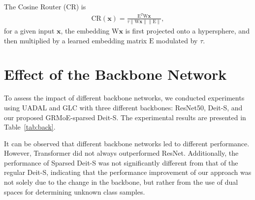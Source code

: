 \documentclass[10pt,twocolumn,letterpaper]{article}
\begin{document}
The Cosine Router (CR) is
\begin{align}
   \text{CR}(\bm{x}) = \frac{\text{E}^T\text{W}\bm{x}}{\tau \|\text{W}\bm{x}\| \|\text{E} \|},
\end{align}
for a given input $\bm{x}$, the embedding $\text{W}\bm{x} $ is first projected onto a hypersphere, and then multiplied by a learned embedding matrix $\text{E}$ modulated by $\tau$.

\section{Effect of the Backbone Network} \label{sec:back}

To assess the impact of different backbone networks, we conducted experiments using UADAL and GLC with three different backbones: ResNet50, Deit-S, and our proposed GRMoE-sparsed Deit-S. The experimental results are presented in Table~\ref{tab:back}.

It can be observed that different backbone networks led to different performance. However, Transformer did not always outperformed ResNet. Additionally, the performance of Sparsed Deit-S was not significantly different from that of the regular Deit-S, indicating that the performance improvement of our approach was not solely due to the change in the backbone, but rather from the use of dual spaces for determining unknown class samples.

\begin{table}[h]    \centering
   \caption{HOS (\%) of UADAL, GLC on Office31, OfficeHome, and VisDA with different backbone networks.}
   \addtolength{\tabcolsep}{3.0pt}
       \label{tab:back}
\end{table}
\end{document}
